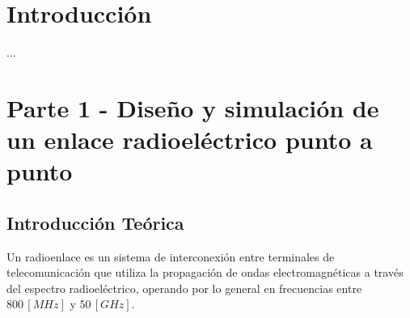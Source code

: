 

\section{Introducción}
\label{sec_1}
...



\section{Parte 1 - Diseño y simulación de un enlace radioeléctrico punto a punto}
\label{sec_2}
\subsection{Introducción Teórica}
\label{sec_2.1}
Un radioenlace es un sistema de interconexión entre terminales de telecomunicación que utiliza la propagación de ondas electromagnéticas a través del espectro radioeléctrico, operando por lo general en frecuencias entre $800 \, [MHz]$ y $50 \, [GHz]$. \cite{b1}


